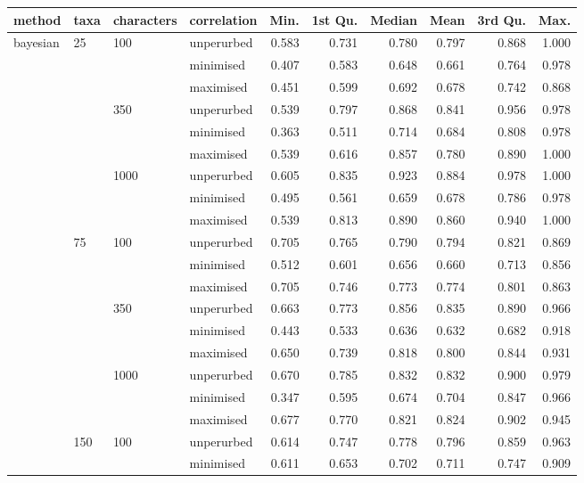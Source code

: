 \begin{longtable}{llllrrrrrr}
  \hline
method & taxa & characters & correlation & Min. & 1st Qu. & Median & Mean & 3rd Qu. & Max. \\ 
  \hline
bayesian & 25 & 100 & unperurbed & 0.583 & 0.731 & 0.780 & 0.797 & 0.868 & 1.000 \\ 
   &  &  & minimised & 0.407 & 0.583 & 0.648 & 0.661 & 0.764 & 0.978 \\ 
   &  &  & maximised & 0.451 & 0.599 & 0.692 & 0.678 & 0.742 & 0.868 \\ 
   &  & 350 & unperurbed & 0.539 & 0.797 & 0.868 & 0.841 & 0.956 & 0.978 \\ 
   &  &  & minimised & 0.363 & 0.511 & 0.714 & 0.684 & 0.808 & 0.978 \\ 
   &  &  & maximised & 0.539 & 0.616 & 0.857 & 0.780 & 0.890 & 1.000 \\ 
   &  & 1000 & unperurbed & 0.605 & 0.835 & 0.923 & 0.884 & 0.978 & 1.000 \\ 
   &  &  & minimised & 0.495 & 0.561 & 0.659 & 0.678 & 0.786 & 0.978 \\ 
   &  &  & maximised & 0.539 & 0.813 & 0.890 & 0.860 & 0.940 & 1.000 \\ 
   & 75 & 100 & unperurbed & 0.705 & 0.765 & 0.790 & 0.794 & 0.821 & 0.869 \\ 
   &  &  & minimised & 0.512 & 0.601 & 0.656 & 0.660 & 0.713 & 0.856 \\ 
   &  &  & maximised & 0.705 & 0.746 & 0.773 & 0.774 & 0.801 & 0.863 \\ 
   &  & 350 & unperurbed & 0.663 & 0.773 & 0.856 & 0.835 & 0.890 & 0.966 \\ 
   &  &  & minimised & 0.443 & 0.533 & 0.636 & 0.632 & 0.682 & 0.918 \\ 
   &  &  & maximised & 0.650 & 0.739 & 0.818 & 0.800 & 0.844 & 0.931 \\ 
   &  & 1000 & unperurbed & 0.670 & 0.785 & 0.832 & 0.832 & 0.900 & 0.979 \\ 
   &  &  & minimised & 0.347 & 0.595 & 0.674 & 0.704 & 0.847 & 0.966 \\ 
   &  &  & maximised & 0.677 & 0.770 & 0.821 & 0.824 & 0.902 & 0.945 \\ 
   & 150 & 100 & unperurbed & 0.614 & 0.747 & 0.778 & 0.796 & 0.859 & 0.963 \\ 
   &  &  & minimised & 0.611 & 0.653 & 0.702 & 0.711 & 0.747 & 0.909 \\ 

\end{longtable}
